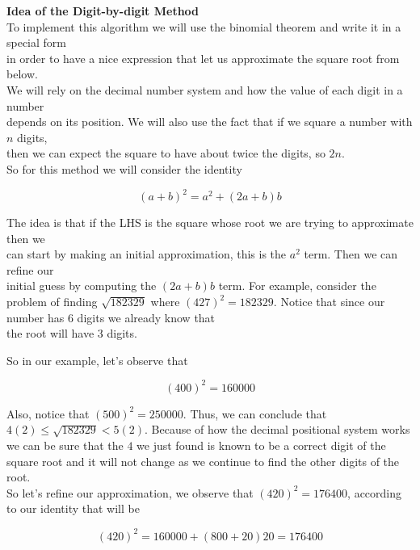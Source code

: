 \documentclass{uofa_template}
\begin{document}
\begin{enumerate}
\textbf{Idea of the Digit-by-digit Method} \\
To implement this algorithm we will use the binomial theorem and write it in a special form \\
in order to have a nice expression that let us approximate the square root from below. \\
We will rely on the decimal number system and how the value of each digit in a number \\
depends on its position. We will also use the fact that if we square a number with $n$ digits, \\
then we can expect the square to have about twice the digits, so $2n$. \\

So for this method we will consider the identity

\begin{equation}
(a+b)^2 = a^2 +(2a+b)b
\end{equation}

The idea is that if the LHS is the square whose root we are trying to approximate then we \\
can start by making an initial approximation, this is the $a^2$ term. Then we can refine our \\
initial guess by computing the $(2a+b)b$ term. For example, consider the problem of finding $\sqrt{182329}$ where $(427)^2 = 182329$. Notice that since our number has 6 digits we already know that \\
the root will have 3 digits.

So in our example, let's observe that

\begin{equation}
(400)^2 = 160000
\end{equation}

Also, notice that $(500)^2 = 250000$. Thus, we can conclude that
$4(2) \leq \sqrt{182329} < 5(2) $. Because of how the decimal positional system works
we can be sure that the $4$ we just found is known to be a correct digit of the square root and it will not change as we continue to find the other digits of the root. \\

So let's refine our approximation, we observe that $(420)^2 = 176400$, according to
our identity that will be

\begin{equation}
(420)^2 = 160000 + (800 + 20)20 = 176400
\end{equation}


\end{enumerate}
\end{document}
